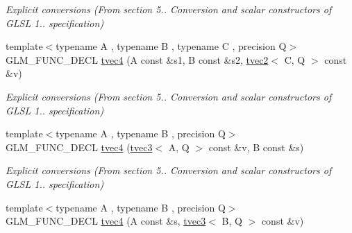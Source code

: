 \begin{DoxyCompactItemize}
\begin{DoxyCompactList}\small\item\em Explicit conversions (From section 5.. Conversion and scalar constructors of G\-L\-S\-L 1.. specification) \end{DoxyCompactList}\item 
\hypertarget{structglm_1_1detail_1_1tvec4_a8ef9e52bfba428b34a6503b41d405414}{{\footnotesize template$<$typename A , typename B , typename C , precision Q$>$ }\\G\-L\-M\-\_\-\-F\-U\-N\-C\-\_\-\-D\-E\-C\-L \hyperlink{structglm_1_1detail_1_1tvec4_a8ef9e52bfba428b34a6503b41d405414}{tvec4} (A const \&s1, B const \&s2, \hyperlink{structglm_1_1detail_1_1tvec2}{tvec2}$<$ C, Q $>$ const \&v)}\label{structglm_1_1detail_1_1tvec4_a8ef9e52bfba428b34a6503b41d405414}

\begin{DoxyCompactList}\small\item\em Explicit conversions (From section 5.. Conversion and scalar constructors of G\-L\-S\-L 1.. specification) \end{DoxyCompactList}\item 
\hypertarget{structglm_1_1detail_1_1tvec4_a3cfd3a19a14623991a562e5834cc6d1f}{{\footnotesize template$<$typename A , typename B , precision Q$>$ }\\G\-L\-M\-\_\-\-F\-U\-N\-C\-\_\-\-D\-E\-C\-L \hyperlink{structglm_1_1detail_1_1tvec4_a3cfd3a19a14623991a562e5834cc6d1f}{tvec4} (\hyperlink{structglm_1_1detail_1_1tvec3}{tvec3}$<$ A, Q $>$ const \&v, B const \&s)}\label{structglm_1_1detail_1_1tvec4_a3cfd3a19a14623991a562e5834cc6d1f}

\begin{DoxyCompactList}\small\item\em Explicit conversions (From section 5.. Conversion and scalar constructors of G\-L\-S\-L 1.. specification) \end{DoxyCompactList}\item 
\hypertarget{structglm_1_1detail_1_1tvec4_a00972125f3cbeec17aaf42cacae4e73e}{{\footnotesize template$<$typename A , typename B , precision Q$>$ }\\G\-L\-M\-\_\-\-F\-U\-N\-C\-\_\-\-D\-E\-C\-L \hyperlink{structglm_1_1detail_1_1tvec4_a00972125f3cbeec17aaf42cacae4e73e}{tvec4} (A const \&s, \hyperlink{structglm_1_1detail_1_1tvec3}{tvec3}$<$ B, Q $>$ const \&v)}\label{structglm_1_1detail_1_1tvec4_a00972125f3cbeec17aaf42cacae4e73e}


\end{DoxyCompactItemize}
